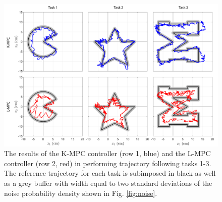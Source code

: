 \begin{figure}
    \centering
    \includegraphics[width=\linewidth]{figures/results_edited_wblue.pdf}
    \caption{The results of the K-MPC controller (row 1, blue) and the L-MPC controller (row 2, red) in performing trajectory following tasks 1-3. The reference trajectory for each task is subimposed in black as well as a grey buffer with width equal to two standard deviations of the noise probability density shown in Fig. \ref{fig:noise}.}
    \label{fig:results}
\end{figure}

